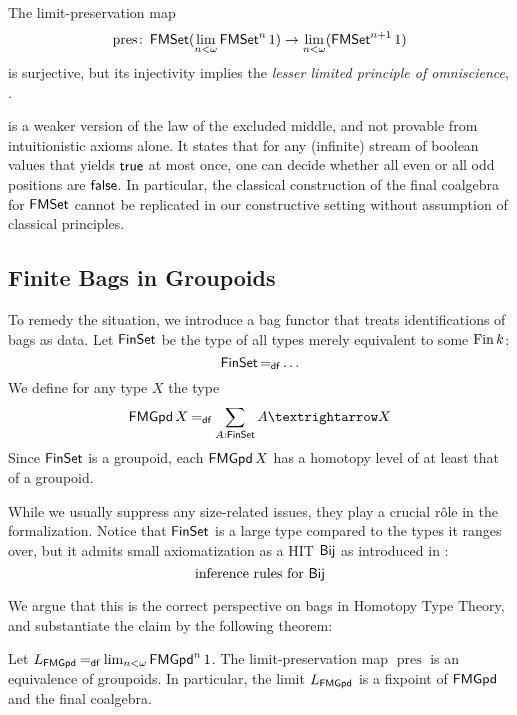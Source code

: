 \documentclass{easychair}
\begin{document}
  \begin{theorem}\label{thm:InjPresImpliesLLPO}
    The limit-preservation map
    \[
        \operatorname{pres}\colon
            \operatorname{\mathsf{FMSet}} (\lim_{n < \omega} \operatorname{\mathsf{FMSet}}^n 1)
            \to
            \lim_{n < \omega} (\operatorname{\mathsf{FMSet}}^{n+1} 1)
    \]
    is surjective,
    but its injectivity implies the \emph{lesser limited principle of omniscience}, \LLPO.
  \end{theorem}
  \LLPO{} \cite[{Ch.\@ 1}]{Bridges1987} is a weaker version of the law of the excluded middle, and not
  provable from intuitionistic axioms alone.
  It states that for any (infinite) stream of boolean values that yields $\mathsf{true}$
  at most once, one can decide whether all even or all odd positions are $\mathsf{false}$.
  In particular, the classical construction of the final coalgebra for $\operatorname{\mathsf{FMSet}}$
  cannot be replicated in our constructive setting without assumption of classical principles.

  \subsection{Finite Bags in Groupoids}

  To remedy the situation, we introduce a bag functor that treats identifications of bags as data.
  Let $\operatorname{\mathsf{FinSet}}$ be the type of all types merely equivalent to some $\operatorname{Fin} k$:
  \[
    \operatorname{\mathsf{FinSet}} \mathbin{=_\mathsf{df}}
      \ldots
  \]
  We define for any type $X$ the type
  \[
    \FMGpd X \DefEq
      \sum_{A : \FinSet} A → X
  \]
  Since $\operatorname{\mathsf{FinSet}}$ is a groupoid, each $\operatorname{\mathsf{FMGpd}} X$ has a homotopy level of at least that of a groupoid.

  While we usually suppress any size-related issues, they play a crucial r\^{o}le in the formalization.
  Notice that $\operatorname{\mathsf{FinSet}}$ is a large type compared to the types it ranges over,
  but it admits small axiomatization as a HIT $\operatorname{\mathsf{Bij}}$ as introduced in \cite{Finster2021}:
  \[
    \text{inference rules for $\operatorname{\mathsf{Bij}}$}
  \]

  We argue that this is the correct perspective on bags in Homotopy Type Theory,
  and substantiate the claim by the following theorem:

  \begin{theorem}\label{thm:FMGpdLim}
    Let $L_{\operatorname{\mathsf{FMGpd}}} \mathbin{=_\mathsf{df}} \lim_{n < \omega} \operatorname{\mathsf{FMGpd}}^n 1$.
    The limit-preservation map $\operatorname{pres}$ is an equivalence of groupoids.
    In particular, the limit $L_{\operatorname{\mathsf{FMGpd}}}$ is a fixpoint of $\operatorname{\mathsf{FMGpd}}$ and the final coalgebra.
  \end{theorem}
\end{document}
